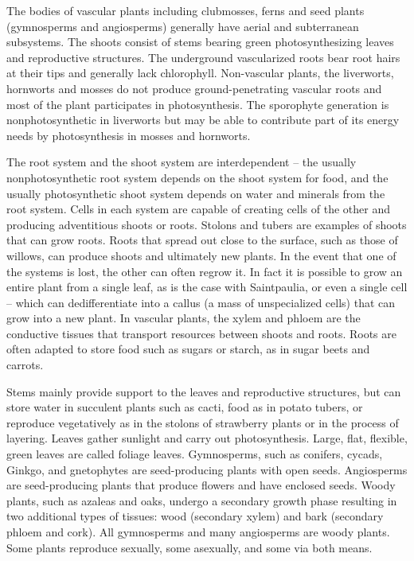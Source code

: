 The bodies of vascular plants including clubmosses, ferns and seed
plants (gymnosperms and angiosperms) generally have aerial and
subterranean subsystems. The shoots consist of stems bearing green
photosynthesizing leaves and reproductive structures. The underground
vascularized roots bear root hairs at their tips and generally lack
chlorophyll. Non-vascular plants, the liverworts, hornworts and mosses
do not produce ground-penetrating vascular roots and most of the plant
participates in photosynthesis. The sporophyte generation is
nonphotosynthetic in liverworts but may be able to contribute part of
its energy needs by photosynthesis in mosses and hornworts.

The root system and the shoot system are interdependent -- the usually
nonphotosynthetic root system depends on the shoot system for food, and
the usually photosynthetic shoot system depends on water and minerals
from the root system. Cells in each system are capable of creating cells
of the other and producing adventitious shoots or roots. Stolons and
tubers are examples of shoots that can grow roots. Roots that spread out
close to the surface, such as those of willows, can produce shoots and
ultimately new plants. In the event that one of the systems is lost, the
other can often regrow it. In fact it is possible to grow an entire
plant from a single leaf, as is the case with Saintpaulia, or even a
single cell -- which can dedifferentiate into a callus (a mass of
unspecialized cells) that can grow into a new plant. In vascular plants,
the xylem and phloem are the conductive tissues that transport resources
between shoots and roots. Roots are often adapted to store food such as
sugars or starch, as in sugar beets and carrots.

Stems mainly provide support to the leaves and reproductive structures,
but can store water in succulent plants such as cacti, food as in potato
tubers, or reproduce vegetatively as in the stolons of strawberry plants
or in the process of layering. Leaves gather sunlight and carry out
photosynthesis. Large, flat, flexible, green leaves are called foliage
leaves. Gymnosperms, such as conifers, cycads, Ginkgo, and gnetophytes
are seed-producing plants with open seeds. Angiosperms are
seed-producing plants that produce flowers and have enclosed seeds.
Woody plants, such as azaleas and oaks, undergo a secondary growth phase
resulting in two additional types of tissues: wood (secondary xylem) and
bark (secondary phloem and cork). All gymnosperms and many angiosperms
are woody plants. Some plants reproduce sexually, some asexually, and
some via both means.

